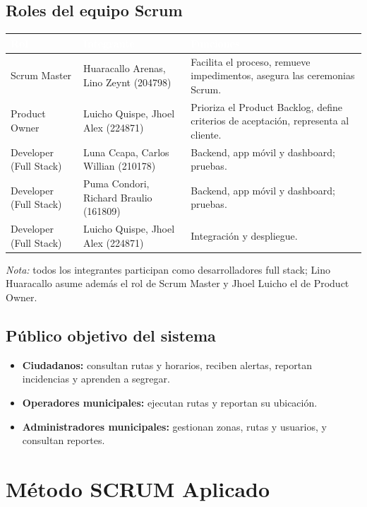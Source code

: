 \documentclass[11pt,a4paper]{article}
\newcommand{\theadcell}[1]{%
  \cellcolor{azuloscuro}\textcolor{white}{\textbf{\small #1}}}
\begin{document}
\subsection{Roles del equipo Scrum}
\begin{table}[H]
\centering
\renewcommand{\arraystretch}{1.3}
\begin{tabularx}{\textwidth}{|l|l|X|}
\hline
\theadcell{Rol} & \theadcell{Integrante} & \theadcell{Funciones} \\
\hline
Scrum Master & Huaracallo Arenas, Lino Zeynt (204798) & Facilita el proceso, remueve impedimentos, asegura las ceremonias Scrum. \\
\hline
Product Owner & Luicho Quispe, Jhoel Alex (224871) & Prioriza el Product Backlog, define criterios de aceptación, representa al cliente. \\
\hline
Developer (Full Stack) & Luna Ccapa, Carlos Willian (210178) & Backend, app móvil y dashboard; pruebas. \\
\hline
Developer (Full Stack) & Puma Condori, Richard Braulio (161809) & Backend, app móvil y dashboard; pruebas. \\
\hline
Developer (Full Stack) & Luicho Quispe, Jhoel Alex (224871) & Integración y despliegue. \\
\hline
\end{tabularx}
\end{table}
\noindent\textit{Nota:} todos los integrantes participan como desarrolladores full stack; Lino Huaracallo asume además el rol de Scrum Master y Jhoel Luicho el de Product Owner.

\subsection{Público objetivo del sistema}
\begin{itemize}[leftmargin=*]
    \item \textbf{Ciudadanos:} consultan rutas y horarios, reciben alertas, reportan incidencias y aprenden a segregar.
    \item \textbf{Operadores municipales:} ejecutan rutas y reportan su ubicación.
    \item \textbf{Administradores municipales:} gestionan zonas, rutas y usuarios, y consultan reportes.
\end{itemize}

\newpage
\section{Método SCRUM Aplicado}
\end{document}
